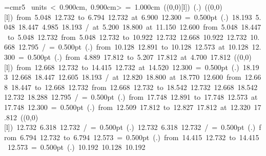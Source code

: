 \font\thinlinefont=cmr5
\mbox{\beginpicture
\setcoordinatesystem units < 0.900cm, 0.900cm>
\unitlength= 1.000cm
\linethickness=1pt
\setplotsymbol ({\makebox(0,0)[l]{\tencirc{}}})
\setshadesymbol ({\thinlinefont .})
\setlinear
%
%
\linethickness=2pt
\setplotsymbol ({\makebox(0,0)[l]{\tencirc{}}})
\putrule from  5.048 12.732 to  6.794 12.732
 at 6.900 12.300
%
%
\linethickness= 0.500pt
\setplotsymbol ({\thinlinefont .})
%
%
 18.193  5.048 18.447  4.985 18.193 /
%
 at 5.200 18.800
 at 11.150 12.600
\putrule from  5.048 18.447 to  5.048 12.732
\putrule from  5.048 12.732 to 10.922 12.732
%
%
 12.668 10.922 12.732 10.668 12.795 /
%
%
%
\linethickness= 0.500pt
\setplotsymbol ({\thinlinefont .})
\putrule from 10.128 12.891 to 10.128 12.573
 at 10.128 12.300
%
%
\linethickness= 0.500pt
\setplotsymbol ({\thinlinefont .})
\putrule from  4.889 17.812 to  5.207 17.812
 at 4.700 17.812
%
%
\linethickness=2pt
\setplotsymbol ({\makebox(0,0)[l]{\tencirc{}}})
\putrule from 12.668 12.732 to 14.415 12.732
 at 14.520 12.300
%
%
\linethickness= 0.500pt
\setplotsymbol ({\thinlinefont .})
%
%
 18.193 12.668 18.447 12.605 18.193 /
%
 at 12.820 18.800
 at 18.770 12.600
\putrule from 12.668 18.447 to 12.668 12.732
\putrule from 12.668 12.732 to 18.542 12.732
%
%
 12.668 18.542 12.732 18.288 12.795 /
%
%
%
\linethickness= 0.500pt
\setplotsymbol ({\thinlinefont .})
\putrule from 17.748 12.891 to 17.748 12.573
 at 17.748 12.300
%
%
\linethickness= 0.500pt
\setplotsymbol ({\thinlinefont .})
\putrule from 12.509 17.812 to 12.827 17.812
 at 12.320 17.812
%
%
\linethickness=2pt
\setplotsymbol ({\makebox(0,0)[l]{\tencirc{}}})
 12.732  6.318 12.732 /
%
%
\linethickness= 0.500pt
\setplotsymbol ({\thinlinefont .})
 12.732  6.318 12.732 /
%
%
\linethickness= 0.500pt
\setplotsymbol ({\thinlinefont .})
\putrule from  6.794 12.732 to  6.794 12.573
%
%
\linethickness= 0.500pt
\setplotsymbol ({\thinlinefont .})
\putrule from 14.415 12.732 to 14.415 12.573
\linethickness= 0.500pt
\setplotsymbol ({\thinlinefont .})
%
%
 10.192     10.128 10.192
}
